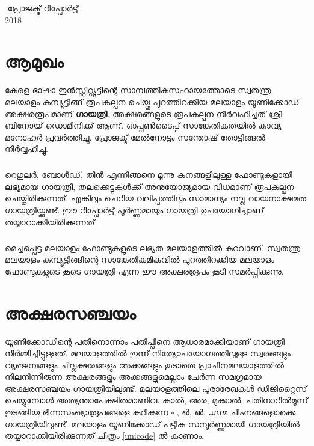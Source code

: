 \documentclass[12pt]{report}
\begin{document}
	
\begin{titlepage}
\BgThispage
\centering
\vfill
{{\Large { ‌ }}}
\vfill
{{\Large {പ്രോജക്ട് റിപ്പോര്‍ട്ട്  }}}\\[.5cm]
{{\Large { 2018}}}\\
\end{titlepage}
 

\thispagestyle{empty}	
\clearpage
	
	\chapter*{ആമുഖം}
	

	കേരള ഭാഷാ ഇന്‍സ്റ്റിറ്റ്യൂട്ടിന്റെ സാമ്പത്തികസഹായത്തോടെ സ്വതന്ത്ര മലയാളം കമ്പ്യൂട്ടിങ്ങ് രൂപകല്പന ചെയ്തു പുറത്തിറക്കിയ മലയാളം യൂണിക്കോഡ് അക്ഷരരൂപമാണ്  \textbf{ഗായത്രി}. അക്ഷരങ്ങളുടെ  രൂപകല്പന നിർവഹിച്ചത് ശ്രീ. ബിനോയ് ഡൊമിനിക്ക് ആണ്. ഓപ്പണ്‍ടൈപ്പ് സാങ്കേതികതയിൽ കാവ്യ മനോഹർ പ്രവർത്തിച്ചു. പ്രോജക്ട് മേല്‍നോട്ടം സന്തോഷ് തോട്ടിങ്ങൽ നിർവ്വഹിച്ചു.
	
	\paragraph{}
	റെഗുലര്‍, ബോള്‍ഡ്, തിന്‍ എന്നിങ്ങനെ മൂന്നു കനങ്ങളിലുള്ള ഫോണ്ടുകളായി ലഭ്യമായ ഗായത്രി, തലക്കെട്ടുകള്‍ക്ക് അനുയോജ്യമായ വിധമാണ് രൂപകല്പന ചെയ്തിരിക്കുന്നത്. എങ്കിലും ചെറിയ വലിപ്പത്തിലും സാമാന്യം നല്ല വായനാക്ഷമത ഗായത്രിയ്ക്കുണ്ട്. ഈ റിപ്പോര്‍ട്ട് പൂര്‍ണ്ണമായും ഗായത്രി  ഉപയോഗിച്ചാണ് തയ്യാറാക്കിയിരിക്കുന്നത്.
	\paragraph{}
	മെച്ചപ്പെട്ട മലയാളം ഫോണ്ടുകളുടെ ലഭ്യത മലയാളത്തിൽ കുറവാണ്. സ്വതന്ത്ര മലയാളം കമ്പ്യൂട്ടിങ്ങിന്റെ സാങ്കേതികമികവിൽ പുറത്തിറക്കിയ  മലയാളം ഫോണ്ടുകളുടെ കൂടെ ഗായത്രി എന്ന ഈ അക്ഷരരൂപം കൂടി സമർപ്പിക്കുന്നു.
\thispagestyle{empty}
\clearpage
	\chapter*{ അക്ഷരസഞ്ചയം}
	

	
	യൂണിക്കോഡിന്റെ പതിനൊന്നാം പതിപ്പിനെ ആധാരമാക്കിയാണ് ഗായത്രി നിര്‍മ്മിച്ചിട്ടുള്ളത്. മലയാളത്തില്‍ ഇന്ന് നിത്യോപയോഗത്തിലുള്ള സ്വരങ്ങളും വ്യഞ്ജനങ്ങളും ചില്ലക്ഷരങ്ങളും അക്കങ്ങളും കൂടാതെ പ്രാചീനമലയാളത്തില്‍ നിലനിന്നിരുന്ന അക്ഷരങ്ങളും അക്കങ്ങളുമെല്ലാം ചേര്‍ന്ന സമഗ്രമായ അക്ഷരസഞ്ചയം ഗായത്രിയിലുണ്ട്. മലയാളത്തിലെ പുരാരേഖകള്‍ ഡിജിറ്റൈസ് ചെയ്യുമ്പോള്‍ അത്യന്താപേക്ഷിതമാണിവ. കാല്‍, അര, മുക്കാല്‍, പതിനാറില്‍മൂന്ന് തുടങ്ങിയ ഭിന്നസംഖ്യാരൂപങ്ങളെ കുറിക്കുന്ന ൳, ൴, ൵, ൸ ചിഹ്നങ്ങളൊക്കെ ഗായത്രിയിലുണ്ട്. മലയാളം യൂണിക്കോഡ് പട്ടിക സമ്പൂർണ്ണമായി ഗായത്രിയിൽ തയ്യാറാക്കിയിരിക്കുന്നത് ചിത്രം \ref{unicode} ല്‍ കാണാം.
	
\end{document}
